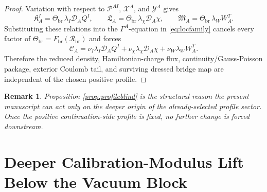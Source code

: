 \documentclass[11pt]{article}
\newcommand{\SpatialD}{\mathcal D}
\newcommand{\ConstCurrent}{\mathcal C}
\newcommand{\ConstGamma}{\Gamma}
\newcommand{\CurvQMult}{\mathscr P}
\newcommand{\CurvChiMult}{\mathscr X}
\newcommand{\CurvTransMult}{\mathscr Y}
\newcommand{\CurvSeed}{\Theta_{\mathrm{br}}}
\newcommand{\CurvProfile}{F_{\mathrm{br}}}
\newcommand{\CurvOneI}{\mathfrak K}
\newcommand{\CurvOneChi}{\mathfrak L}
\newcommand{\CurvOneW}{\mathfrak M}
\newcommand{\BridgeCurv}{\mathcal R_{\mathrm{br}}}
\newtheorem{remark}{Remark}
\begin{document}
\begin{proof}
Variation with respect to \(\CurvQMult^{AI}\), \(\CurvChiMult^A\), and \(\CurvTransMult^A\) gives
\[
\CurvOneI_A^I=\CurvSeed\,\lambda_I\SpatialD_AQ^I,
\qquad
\CurvOneChi_A=\CurvSeed\,\lambda_\chi\SpatialD_A\chi,
\qquad
\CurvOneW_A=\CurvSeed\,\lambda_WW_A^T.
\]
Substituting these relations into the \(\ConstGamma^A\)-equation in \eqref{eq:locfamily} cancels every factor of \(\CurvSeed=\CurvProfile(\BridgeCurv)\) and forces
\[
\ConstCurrent_A
=
\nu_I\lambda_I\SpatialD_AQ^I
+\nu_\chi\lambda_\chi\SpatialD_A\chi
+\nu_W\lambda_WW_A^T.
\]
Therefore the reduced density, Hamiltonian-charge flux, continuity/Gauss-Poisson package, exterior Coulomb tail, and surviving dressed bridge map are independent of the chosen positive profile.
\end{proof}

\begin{remark}
Proposition \ref{prop:profileblind} is the structural reason the present manuscript can act only on the deeper origin of the already-selected profile sector. Once the positive continuation-side profile is fixed, no further change is forced downstream.
\end{remark}

\section{Deeper Calibration-Modulus Lift Below the Vacuum Block}
\end{document}
